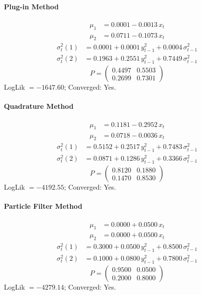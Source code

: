 \documentclass[11pt, a4paper]{article}
\begin{document}
\paragraph{Plug-in Method}
\begin{align}
\mu_{1} &= 0.0001 -0.0013\, x_t \\
\mu_{2} &= 0.0711 -0.1073\, x_t
\end{align}
\begin{align}
\sigma^2_{t}(1) &= 0.0001 + 0.0001\, y_{t-1}^2 + 0.0004\, \sigma^2_{t-1} \\
\sigma^2_{t}(2) &= 0.1963 + 0.2551\, y_{t-1}^2 + 0.7449\, \sigma^2_{t-1}
\end{align}
\begin{equation}
P = \begin{pmatrix} 0.4497 & 0.5503 \\ 0.2699 & 0.7301 \end{pmatrix}
\end{equation}
LogLik $= -1647.60$; Converged: Yes.

\paragraph{Quadrature Method}
\begin{align}
\mu_{1} &= 0.1181 -0.2952\, x_t \\
\mu_{2} &= 0.0718 -0.0036\, x_t
\end{align}
\begin{align}
\sigma^2_{t}(1) &= 0.5152 + 0.2517\, y_{t-1}^2 + 0.7483\, \sigma^2_{t-1} \\
\sigma^2_{t}(2) &= 0.0871 + 0.1286\, y_{t-1}^2 + 0.3366\, \sigma^2_{t-1}
\end{align}
\begin{equation}
P = \begin{pmatrix} 0.8120 & 0.1880 \\ 0.1470 & 0.8530 \end{pmatrix}
\end{equation}
LogLik $= -4192.55$; Converged: Yes.

\paragraph{Particle Filter Method}
\begin{align}
\mu_{1} &= 0.0000 + 0.0500\, x_t \\
\mu_{2} &= 0.0000 + 0.0500\, x_t
\end{align}
\begin{align}
\sigma^2_{t}(1) &= 0.3000 + 0.0500\, y_{t-1}^2 + 0.8500\, \sigma^2_{t-1} \\
\sigma^2_{t}(2) &= 0.1000 + 0.0800\, y_{t-1}^2 + 0.7800\, \sigma^2_{t-1}
\end{align}
\begin{equation}
P = \begin{pmatrix} 0.9500 & 0.0500 \\ 0.2000 & 0.8000 \end{pmatrix}
\end{equation}
LogLik $= -4279.14$; Converged: Yes.
\end{document}
